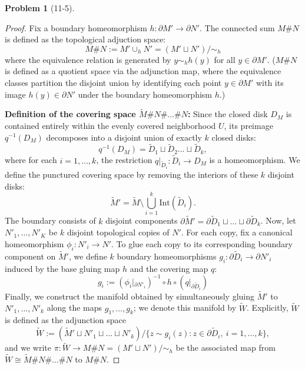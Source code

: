 \documentclass[11pt, a4paper]{article}
\theoremstyle{definition}
\newtheorem{prob}{Problem}
\newenvironment{problem}[1][]{\begin{prob}[#1]\normalfont}{\end{prob}\vspace{1.5em}}
\begin{document}
\begin{problem}[11-5]
\begin{proof}
    Fix a boundary homeomorphism $h: \partial M' \to \partial N'$. The connected sum $M \# N$ is defined as the topological 
    adjuction space: 
    $$M \# N := M' \cup_h N' = (M' \sqcup N') / \sim_h$$
    where the equivalence relation is generated by $y \sim_h h(y)$ for all $y \in \partial M'$.
    ($M \# N$ is defined as a quotient space via the adjunction map, where the equivalence classes partition the 
    disjoint union by identifying each point $y \in \partial M'$ with its image $h(y) \in \partial N'$ under the 
    boundary homeomorphism $h$.)

    \item[$3^ \circ$] \textbf{Definition of the covering space $\widetilde{M} \# N \# \dots \# N$:} Since the closed 
    disk $D_M$ is contained entirely within the evenly covered neighborhood $U$, its preimage $q^{-1}(D_M)$ 
    decomposes into a disjoint union of exactly $k$ closed disks:
    $$q^{-1}(D_M) = \widetilde{D}_1 \sqcup \widetilde{D}_2 \dots \sqcup \widetilde{D}_k, $$
    where for each $i = 1, \dots, k$, the restriction $q|_{\widetilde{D}_i}: \widetilde{D}_i \to D_M$ is a 
    homeomorphism.
    We define the punctured covering space by removing the interiors of these $k$ disjoint disks: 
    $$\widetilde{M}' = \widetilde{M}\setminus \bigcup ^k_{i = 1} \text{Int}(\widetilde{D}_i).$$
    The boundary consists of $k$ disjoint components 
    $\partial \widetilde{M}' = \partial \widetilde{D}_1 \sqcup \dots \sqcup \partial \widetilde{D}_k$.
    Now, let $N'_1, \dots, N'_K$ be $k$ disjoint topological copies of $N'$. For each copy, fix a canonical 
    homeomorphism $\phi_i: N'_i \to N'$. To glue each copy to its corresponding boundary component on $\widetilde{M}'$, 
    we define $k$ boundary homeomorphisms $g_i: \partial \widetilde{D}_i \to \partial N'_i$ induced by the base 
    gluing map $h$ and the covering map $q$: 
    $$g_i := (\phi_i\vert{}_{\partial N'_i})^{-1} \circ h \circ (q\vert{}_{\partial \widetilde{D}_i})$$
    Finally, we construct the manifold obtained by simultaneously gluing $\widetilde{M}'$ to $N'_1, \dots, N'_k$ 
    along the maps $g_1,\dots,g_k$; we denote this manifold by $\widetilde{W}$. Explicitly, $\widetilde{W}$ 
    is defined as the adjunction space
    $$\widetilde{W} := \left( \widetilde{M}' \sqcup N'_1 \sqcup \dots \sqcup N'_k \right) \big/ \{z \sim g_i(z) : z \in \partial \widetilde{D}_i,\ i = 1,\dots,k\},$$
    and we write
    $\pi : \widetilde{W} \rightarrow M \# N = (M' \sqcup N') / \sim_h$ be the associated map from 
    $\widetilde{W} \cong \widetilde{M} \# N \# \dots \# N$ to $M \# N$.


\end{proof}
\end{problem}
\end{document}

